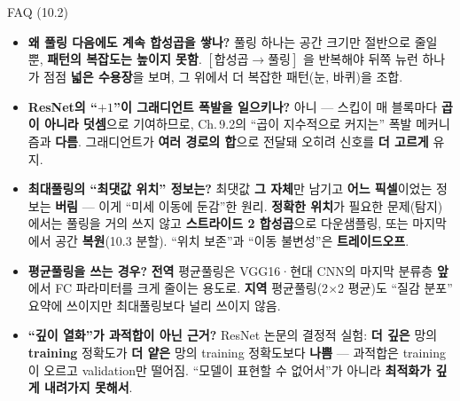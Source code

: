 \documentclass[aspectratio=169,11pt]{beamer}
\begin{document}
\begin{frame}{FAQ (10.2)}
  \small
  \begin{itemize}
    \item \textbf{왜 풀링 다음에도 계속 합성곱을 쌓나?} 풀링 하나는
      공간 크기만 절반으로 줄일 뿐, \textbf{패턴의 복잡도는
      높이지 못함}. $[\text{합성곱}\to\text{풀링}]$ 을 반복해야
      뒤쪽 뉴런 하나가 점점 \textbf{넓은 수용장}을 보며,
      그 위에서 더 복잡한 패턴(눈, 바퀴)을 조합.
    \item \textbf{ResNet의 ``$+1$''이 그래디언트 폭발을 일으키나?}
      아니 --- 스킵이 매 블록마다 \textbf{곱이 아니라 덧셈}으로
      기여하므로, Ch.\,9.2의 ``곱이 지수적으로 커지는'' 폭발
      메커니즘과 \textbf{다름}. 그래디언트가 \textbf{여러 경로의 합}으로
      전달돼 오히려 신호를 \textbf{더 고르게} 유지.
    \item \textbf{최대풀링의 ``최댓값 위치'' 정보는?} 최댓값 \textbf{그
      자체}만 남기고 \textbf{어느 픽셀}이었는 정보는 \textbf{버림}
      --- 이게 ``미세 이동에 둔감''한 원리. \textbf{정확한 위치}가
      필요한 문제(탐지)에서는 풀링을 거의 쓰지 않고
      \textbf{스트라이드 2 합성곱}으로 다운샘플링, 또는
      마지막에서 공간 \textbf{복원}(10.3 분할).
      ``위치 보존''과 ``이동 불변성''은 \textbf{트레이드오프}.
    \item \textbf{평균풀링을 쓰는 경우?} \textbf{전역} 평균풀링은
      VGG16·현대 CNN의 마지막 분류층 \textbf{앞}에서 FC 파라미터를
      크게 줄이는 용도로. \textbf{지역} 평균풀링(2$\times$2 평균)도
      ``질감 분포'' 요약에 쓰이지만 최대풀링보다 널리 쓰이지 않음.
    \item \textbf{``깊이 열화''가 과적합이 아닌 근거?} ResNet 논문의
      결정적 실험: \textbf{더 깊은} 망의 \textbf{training} 정확도가
      \textbf{더 얕은} 망의 training 정확도보다 \textbf{나쁨} ---
      과적합은 training이 오르고 validation만 떨어짐. ``모델이
      표현할 수 없어서''가 아니라 \textbf{최적화가 깊게 내려가지
      못해서}.
  \end{itemize}
\end{frame}
\end{document}
